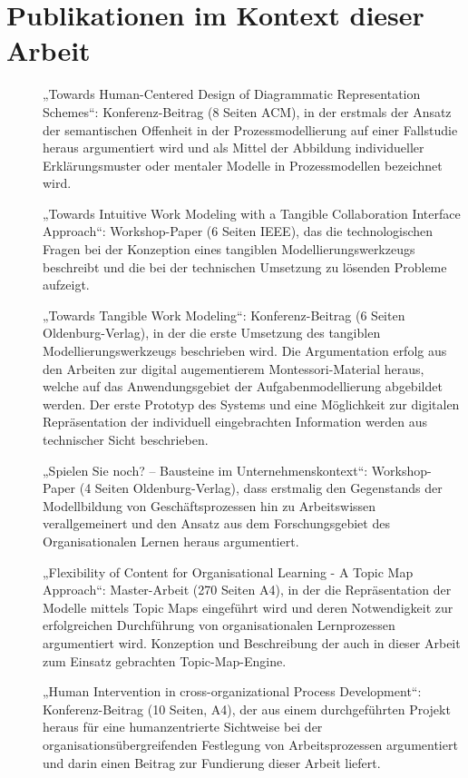 \chapter*{Publikationen im Kontext dieser Arbeit}

\begin{description}
	\item[\citet{Oppl05a}] „Towards Human-Centered Design of Diagrammatic Representation Schemes“: Konferenz-Beitrag (8 Seiten ACM), in der erstmals der Ansatz der semantischen Offenheit in der Prozessmodellierung auf einer Fallstudie heraus argumentiert wird und als Mittel der Abbildung individueller Erklärungsmuster oder mentaler Modelle in Prozessmodellen bezeichnet wird.
	\item[\citet{Oppl06}] „Towards Intuitive Work Modeling with a Tangible Collaboration Interface Approach“: Workshop-Paper (6 Seiten IEEE), das die technologischen Fragen bei der Konzeption eines tangiblen Modellierungswerkzeugs beschreibt und die bei der technischen Umsetzung zu lösenden Probleme aufzeigt.
	\item[\citet{Oppl06a}] „Towards Tangible Work Modeling“: Konferenz-Beitrag (6 Seiten Oldenburg-Verlag), in der die erste Umsetzung des tangiblen Modellierungswerkzeugs beschrieben wird. Die Argumentation erfolg aus den Arbeiten zur digital augementierem Montessori-Material heraus, welche auf das Anwendungsgebiet der Aufgabenmodellierung abgebildet werden. Der erste Prototyp des Systems und eine Möglichkeit zur digitalen Repräsentation der individuell eingebrachten Information werden aus technischer Sicht beschrieben.
	\item[\citet{Oppl07b}] „Spielen Sie noch? -- Bausteine im Unternehmenskontext“: Workshop-Paper (4 Seiten Oldenburg-Verlag), dass erstmalig den Gegenstands der Modellbildung von Geschäftsprozessen hin zu Arbeitswissen verallgemeinert und den Ansatz aus dem Forschungsgebiet des Organisationalen Lernen heraus argumentiert. 
	\item[\citet{Oppl07}] „Flexibility of Content for Organisational Learning - A Topic Map Approach“: Master-Arbeit (270 Seiten A4), in der die Repräsentation der Modelle mittels Topic Maps eingeführt wird und deren Notwendigkeit zur erfolgreichen Durchführung von organisationalen Lernprozessen argumentiert wird. Konzeption und Beschreibung der auch in dieser Arbeit zum Einsatz gebrachten Topic-Map-Engine.
	\item[\citet{Oppl07a}] „Human Intervention in cross-organizational Process Development“: Konferenz-Beitrag (10 Seiten, A4), der aus einem durchgeführten Projekt heraus für eine humanzentrierte Sichtweise bei der organisationsübergreifenden Festlegung von Arbeitsprozessen argumentiert und darin einen Beitrag zur Fundierung dieser Arbeit liefert.

\end{description}
